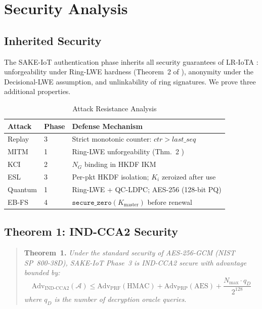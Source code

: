 \documentclass[conference]{IEEEtran}
\newcommand{\Kmaster}{K_{\mathrm{master}}}
\newcommand{\Nmax}{N_{\max}}
\begin{document}
\section{Security Analysis}
\label{sec:security}

\subsection{Inherited Security}

The SAKE-IoT authentication phase inherits all security guarantees of
LR-IoTA \cite{kumari2022}: unforgeability under Ring-LWE hardness
(Theorem~2 of \cite{kumari2022}), anonymity under the Decisional-LWE
assumption, and unlinkability of ring signatures. We prove three
additional properties.

\begin{table}[t]
\centering
\caption{Attack Resistance Analysis}
\label{tab:attacks}
\renewcommand{\arraystretch}{1.15}
\begin{tabular}{p{1.5cm}p{1cm}p{4.5cm}}
\toprule
\textbf{Attack} & \textbf{Phase} & \textbf{Defense Mechanism} \\
\midrule
Replay & 3 & Strict monotonic counter: $ctr > \mathit{last\_seq}$ \\
MITM & 1 & Ring-LWE unforgeability (Thm.~2 \cite{kumari2022}) \\
KCI & 2 & $N_G$ binding in HKDF IKM \\
ESL & 3 & Per-pkt HKDF isolation; $K_i$ zeroized after use \\
Quantum & 1 & Ring-LWE + QC-LDPC; AES-256 (128-bit PQ) \\
EB-FS & 4 & $\texttt{secure\_zero}(\Kmaster)$ before renewal \\
\bottomrule
\end{tabular}
\end{table}

\subsection{Theorem 1: IND-CCA2 Security}

\begin{quote}
\textbf{Theorem~1.}
\label{thm:indcca2}
\textit{Under the standard security of AES-256-GCM (NIST SP~800-38D),
SAKE-IoT Phase~3 is IND-CCA2 secure with advantage bounded by:}
\begin{equation}
\mathrm{Adv}_{\text{IND-CCA2}}(\mathcal{A}) \leq
\mathrm{Adv}_{\text{PRF}}(\text{HMAC}) +
\mathrm{Adv}_{\text{PRP}}(\text{AES}) +
\frac{\Nmax \cdot q_D}{2^{128}}
\label{eq:indcca2}
\end{equation}
\textit{where $q_D$ is the number of decryption oracle queries.}
\end{quote}
\end{document}
